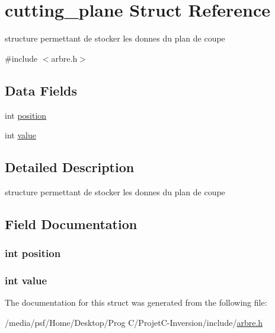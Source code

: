 \hypertarget{structcutting__plane}{\section{cutting\-\_\-plane Struct Reference}
\label{structcutting__plane}
}


structure permettant de stocker les donnes du plan de coupe  




{\ttfamily \#include $<$arbre.\-h$>$}

\subsection*{Data Fields}
\begin{DoxyCompactItemize}
\item 
int \hyperlink{structcutting__plane_a401e942526aac47cef94f478182486e7}{position}
\item 
int \hyperlink{structcutting__plane_ac4f474c82e82cbb89ca7c36dd52be0ed}{value}
\end{DoxyCompactItemize}


\subsection{Detailed Description}
structure permettant de stocker les donnes du plan de coupe 

\subsection{Field Documentation}
\hypertarget{structcutting__plane_a401e942526aac47cef94f478182486e7}{
\subsubsection[{position}]{\setlength{\rightskip}{0pt plus 5cm}int position}}\label{structcutting__plane_a401e942526aac47cef94f478182486e7}
\hypertarget{structcutting__plane_ac4f474c82e82cbb89ca7c36dd52be0ed}{
\subsubsection[{value}]{\setlength{\rightskip}{0pt plus 5cm}int value}}\label{structcutting__plane_ac4f474c82e82cbb89ca7c36dd52be0ed}


The documentation for this struct was generated from the following file\-:\begin{DoxyCompactItemize}
\item 
/media/psf/\-Home/\-Desktop/\-Prog C/\-Projet\-C-\/\-Inversion/include/\hyperlink{arbre_8h}{arbre.\-h}\end{DoxyCompactItemize}

